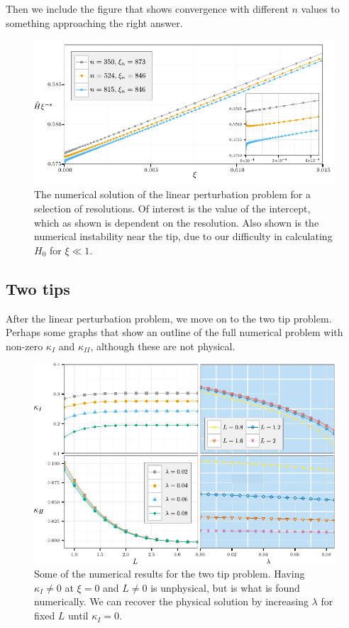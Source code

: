 \documentclass{jfm}
\begin{document}
Then we include the figure that shows convergence with different $n$ values
to something approaching the right answer.
\begin{figure}
 \centerline{
\includegraphics{./../../Graphs/linear-perturbation-plot-edited.pdf}}
  \caption{The numerical solution of the linear perturbation problem for a selection of
           resolutions. Of interest is the value of the intercept, which as shown is dependent
           on the resolution. Also shown is the numerical instability near the tip, due to our 
           difficulty in calculating $H_0$ for $\xi \ll 1$.}
\end{figure}

\subsection{Two tips}
After the linear perturbation problem, we move on to the two tip
problem. Perhaps some graphs that show an outline of the full numerical problem
with non-zero $\kappa_I$ and $\kappa_{II}$, although these are not physical.
\begin{figure}
 \centerline{
\includegraphics{./../../Graphs/KI-KII-edited.pdf}}
  \caption{Some of the numerical results for the two tip problem. Having 
           $\kappa_{I} \neq 0$ at $\xi =0$ and $L \neq 0$ is unphysical, but
           is what is found numerically. We can recover the physical solution
           by increasing $\lambda$ for fixed $L$ until $\kappa_I =0$.}
\end{figure}
\end{document}
